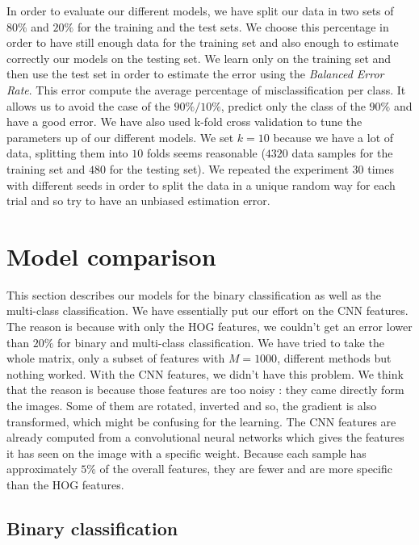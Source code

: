 \documentclass{article} %
\begin{document}
In order to evaluate our different models, we have split our data in two sets of $80\%$ and $20\%$ for the training and the test sets. We choose this percentage in order to have still enough data for the training set and also enough to estimate correctly our models on the testing set. We learn only on the training set and then use the test set in order to estimate the error using the \textit{Balanced Error Rate}. This error compute the average percentage of misclassification per class. It allows us to avoid the case of the $90\%/10\%$, predict only the class of the $90\%$ and have a good error. We have also used k-fold cross validation to tune the parameters up of our different models. We set $k=10$ because we have a lot of data, splitting them into $10$ folds seems reasonable ($4320$ data samples for the training set and $480$ for the testing set). We repeated the experiment $30$ times with different seeds in order to split the data in a unique random way for each trial and so try to have an unbiased estimation error. 

\section{Model comparison}

This section describes our models for the binary classification as well as the multi-class classification. We have essentially put our effort on the CNN features. The reason is because with only the HOG features, we couldn't get an error lower than $20\%$ for binary and multi-class classification. We have tried to take the whole matrix, only a subset of features with $M = 1000$, different methods but nothing worked. With the CNN features, we didn't have this problem. We think that the reason is because those features are too noisy : they came directly form the images. Some of them are rotated, inverted and so, the gradient is also transformed, which might be confusing for the learning. The CNN features are already computed from a convolutional neural networks which gives the features it has seen on the image with a specific weight. Because each sample has approximately $5\%$ of the overall features, they are fewer and are more specific than the HOG features.

\subsection{Binary classification}
\end{document}
